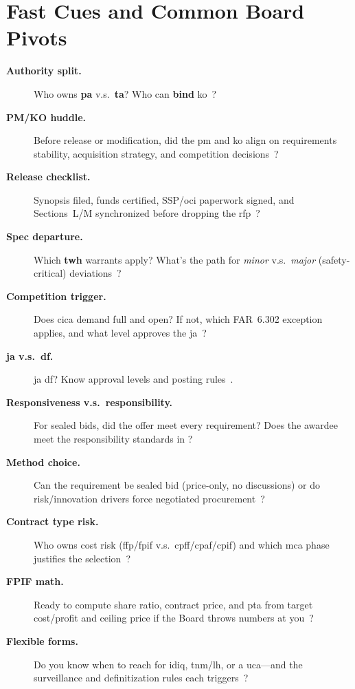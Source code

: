 \documentclass[../main.tex]{subfiles}
\begin{document}
\section{Fast Cues and Common Board Pivots}
\begin{description}
  \item[\textbf{Authority split.}] Who owns \textbf{\ac{pa}} v.s.\ \textbf{\ac{ta}}? Who can \textbf{bind} \ac{ko}~\autocite{SECNAV5400-15D,SECNAV5000-2G,FAR}?
  \item[\textbf{PM/KO huddle.}] Before release or modification, did the \ac{pm} and \ac{ko} align on requirements stability, acquisition strategy, and competition decisions~\autocite{DoDI5000-85,edo-3-2-1-intro-contracting-2025}?
  \item[\textbf{Release checklist.}] Synopsis filed, funds certified, SSP/\ac{oci} paperwork signed, and Sections~L/M synchronized before dropping the \ac{rfp}~\autocite{FAR,NAVSEA-Source-Selection-Guide-2022,edo-3-2-2-solicitation-prep-2025}?
  \item[\textbf{Spec departure.}] Which \textbf{\ac{twh}} warrants apply? What's the path for \emph{minor} v.s.\ \emph{major} (safety-critical) deviations~\autocite{SECNAV5400-15D}?
  \item[\textbf{Competition trigger.}] Does \ac{cica} demand full and open? If not, which FAR~6.302 exception applies, and what level approves the \acrshort{ja}~\autocite{USC-3201-CICA,FAR}?
  \item[\textbf{\acrshort{ja} v.s.\ \acrshort{df}.}] \ac{ja} \ac{df}? Know approval levels and posting rules~\autocite{FAR}.
  \item[\textbf{Responsiveness v.s.\ responsibility.}] For sealed bids, did the offer meet every requirement? Does the awardee meet the responsibility standards in \autocite[\S~9.104]{FAR}?
  \item[\textbf{Method choice.}] Can the requirement be sealed bid (price-only, no discussions) or do risk/innovation drivers force negotiated procurement~\autocite{FAR,NAVSEA-Source-Selection-Guide-2022}?
  \item[\textbf{Contract type risk.}] Who owns cost risk (\ac{ffp}/\ac{fpif} v.s.\ \ac{cpff}/\ac{cpaf}/\ac{cpif}) and which \ac{mca} phase justifies the selection~\autocite{FAR,DoDI5000-85}?
  \item[\textbf{FPIF math.}] Ready to compute share ratio, contract price, and \ac{pta} from target cost/profit and ceiling price if the Board throws numbers at you~\autocite{FAR,NAVSEA-Contracts-Handbook-2023}?
  \item[\textbf{Flexible forms.}] Do you know when to reach for \ac{idiq}, \ac{tnm}/\ac{lh}, or a \ac{uca}---and the surveillance and definitization rules each triggers~\autocite{FAR,NMCARS,DFARS}?

\end{description}
\end{document}
